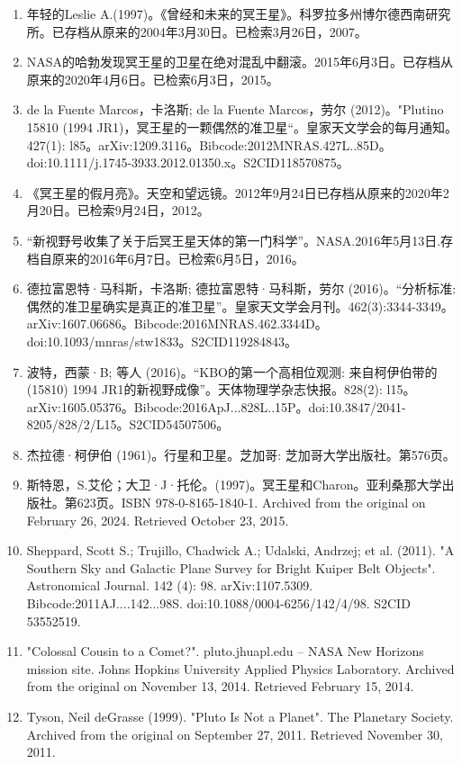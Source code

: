 \begin{enumerate}
\item 年轻的Leslie A.(1997)。《曾经和未来的冥王星》。科罗拉多州博尔德西南研究所。已存档从原来的2004年3月30日。已检索3月26日，2007。
\item NASA的哈勃发现冥王星的卫星在绝对混乱中翻滚。2015年6月3日。已存档从原来的2020年4月6日。已检索6月3日，2015。
\item de la Fuente Marcos，卡洛斯; de la Fuente Marcos，劳尔 (2012)。"Plutino 15810 (1994 JR1)，冥王星的一颗偶然的准卫星“。皇家天文学会的每月通知。427(1): l85。arXiv:1209.3116。Bibcode:2012MNRAS.427L..85D。doi:10.1111/j.1745-3933.2012.01350.x。S2CID118570875。 
\item 《冥王星的假月亮》。天空和望远镜。2012年9月24日已存档从原来的2020年2月20日。已检索9月24日，2012。
\item “新视野号收集了关于后冥王星天体的第一门科学”。NASA.2016年5月13日.存档自原来的2016年6月7日。已检索6月5日，2016。
\item 德拉富恩特·马科斯，卡洛斯; 德拉富恩特·马科斯，劳尔 (2016)。“分析标准: 偶然的准卫星确实是真正的准卫星”。皇家天文学会月刊。462(3):3344-3349。arXiv:1607.06686。Bibcode:2016MNRAS.462.3344D。doi:10.1093/mnras/stw1833。S2CID119284843。 
\item 波特，西蒙·B; 等人 (2016)。“KBO的第一个高相位观测: 来自柯伊伯带的 (15810) 1994 JR1的新视野成像”。天体物理学杂志快报。828(2): l15。arXiv:1605.05376。Bibcode:2016ApJ...828L..15P。doi:10.3847/2041-8205/828/2/L15。S2CID54507506。 
\item 杰拉德·柯伊伯 (1961)。行星和卫星。芝加哥: 芝加哥大学出版社。第576页。
\item 斯特恩，S.艾伦；大卫·J·托伦。(1997)。冥王星和Charon。亚利桑那大学出版社。第623页。ISBN 978-0-8165-1840-1. Archived from the original on February 26, 2024. Retrieved October 23, 2015.
\item Sheppard, Scott S.; Trujillo, Chadwick A.; Udalski, Andrzej; et al. (2011). "A Southern Sky and Galactic Plane Survey for Bright Kuiper Belt Objects". Astronomical Journal. 142 (4): 98. arXiv:1107.5309. Bibcode:2011AJ....142...98S. doi:10.1088/0004-6256/142/4/98. S2CID 53552519.
\item "Colossal Cousin to a Comet?". pluto.jhuapl.edu – NASA New Horizons mission site. Johns Hopkins University Applied Physics Laboratory. Archived from the original on November 13, 2014. Retrieved February 15, 2014.
\item Tyson, Neil deGrasse (1999). "Pluto Is Not a Planet". The Planetary Society. Archived from the original on September 27, 2011. Retrieved November 30, 2011.

\end{enumerate}
